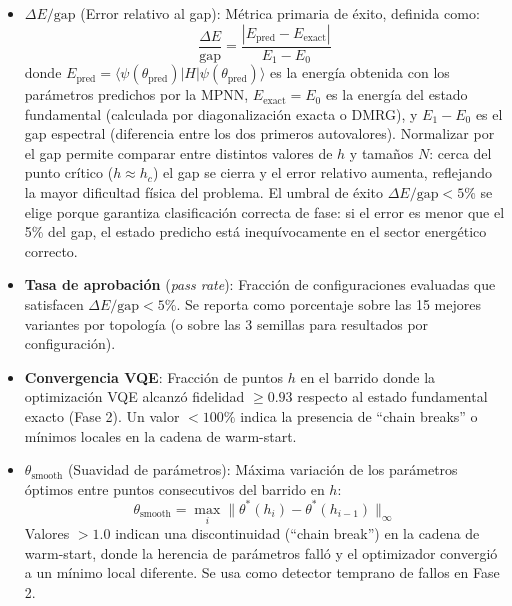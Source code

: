 \documentclass[11pt,a4paper,spanish]{book}
\begin{document}
\begin{itemize}
    \item \textbf{$\Delta E/\text{gap}$} (Error relativo al gap): Métrica primaria de éxito, definida como:
    \begin{equation}
    \frac{\Delta E}{\text{gap}} = \frac{|E_{\text{pred}} - E_{\text{exact}}|}{E_1 - E_0}
    \end{equation}
    donde $E_{\text{pred}} = \langle \psi(\theta_{\text{pred}}) | H | \psi(\theta_{\text{pred}}) \rangle$ es la energía obtenida con los parámetros predichos por la MPNN, $E_{\text{exact}} = E_0$ es la energía del estado fundamental (calculada por diagonalización exacta o DMRG), y $E_1 - E_0$ es el gap espectral (diferencia entre los dos primeros autovalores). Normalizar por el gap permite comparar entre distintos valores de $h$ y tamaños $N$: cerca del punto crítico ($h \approx h_c$) el gap se cierra y el error relativo aumenta, reflejando la mayor dificultad física del problema. El umbral de éxito $\Delta E/\text{gap} < 5\%$ se elige porque garantiza clasificación correcta de fase: si el error es menor que el 5\% del gap, el estado predicho está inequívocamente en el sector energético correcto.

    \item \textbf{Tasa de aprobación} (\emph{pass rate}): Fracción de configuraciones evaluadas que satisfacen $\Delta E/\text{gap} < 5\%$. Se reporta como porcentaje sobre las 15 mejores variantes por topología (o sobre las 3 semillas para resultados por configuración).

    \item \textbf{Convergencia VQE}: Fracción de puntos $h$ en el barrido donde la optimización VQE alcanzó fidelidad $\geq 0.93$ respecto al estado fundamental exacto (Fase 2). Un valor $< 100\%$ indica la presencia de ``chain breaks'' o mínimos locales en la cadena de warm-start.

    \item \textbf{$\theta_{\text{smooth}}$} (Suavidad de parámetros): Máxima variación de los parámetros óptimos entre puntos consecutivos del barrido en $h$:
    \begin{equation}
    \theta_{\text{smooth}} = \max_i \| \theta^*(h_i) - \theta^*(h_{i-1}) \|_\infty
    \end{equation}
    Valores $> 1.0$ indican una discontinuidad (``chain break'') en la cadena de warm-start, donde la herencia de parámetros falló y el optimizador convergió a un mínimo local diferente. Se usa como detector temprano de fallos en Fase 2.


\end{itemize}
\end{document}
